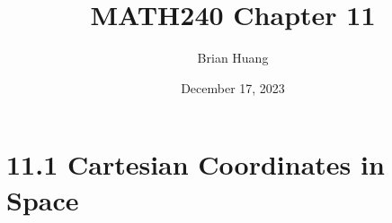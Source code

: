 \documentclass{article} %
\title{MATH240 Chapter 11} %
\author{Brian Huang} %
\date{December 17, 2023} %
\begin{document}
    \maketitle
    \newpage
    \section*{11.1 Cartesian Coordinates in Space} 
    
    
\end{document}
